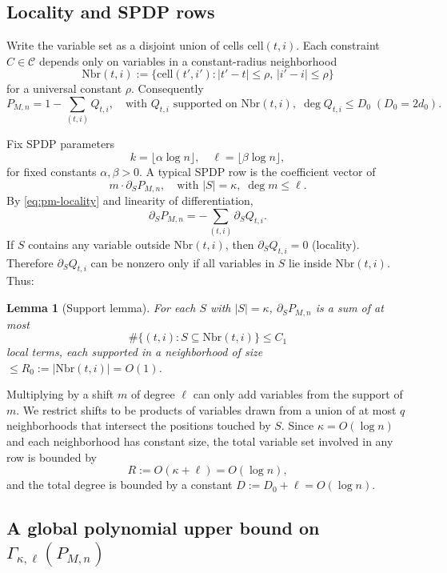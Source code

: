 \documentclass[12pt]{article}
\newtheorem{lemma}[theorem]{Lemma}
\theoremstyle{definition}
\theoremstyle{definition}
\theoremstyle{remark}
\theoremstyle{remark}
\begin{document}
\subsection{Locality and SPDP rows}

Write the variable set as a disjoint union of cells $\mathrm{cell}(t,i)$. Each constraint $C \in \mathcal{C}$ depends only on variables in a constant-radius neighborhood
\[
\mathrm{Nbr}(t,i) := \{\mathrm{cell}(t',i') : |t' - t| \leq \rho, \, |i' - i| \leq \rho\}
\]
for a universal constant $\rho$. Consequently
\begin{equation}\label{eq:pm-locality}
P_{M,n} = 1 - \sum_{(t,i)} Q_{t,i}, \quad\text{with } Q_{t,i} \text{ supported on } \mathrm{Nbr}(t,i), \; \deg Q_{t,i} \leq D_0 \; (D_0 = 2d_0).
\end{equation}

Fix SPDP parameters
\[
k = \lfloor \alpha \log n \rfloor, \quad \ell = \lfloor \beta \log n \rfloor,
\]
for fixed constants $\alpha, \beta > 0$. A typical SPDP row is the coefficient vector of
\[
m \cdot \partial_S P_{M,n}, \quad\text{with } |S| = \kappa, \; \deg m \leq \ell.
\]
By \eqref{eq:pm-locality} and linearity of differentiation,
\[
\partial_S P_{M,n} = - \sum_{(t,i)} \partial_S Q_{t,i}.
\]
If $S$ contains any variable outside $\mathrm{Nbr}(t,i)$, then $\partial_S Q_{t,i} = 0$ (locality). Therefore $\partial_S Q_{t,i}$ can be nonzero only if all variables in $S$ lie inside $\mathrm{Nbr}(t,i)$. Thus:

\begin{lemma}[Support lemma]\label{lem:tm-support}
For each $S$ with $|S| = \kappa$, $\partial_S P_{M,n}$ is a sum of at most
\[
\#\{(t,i) : S \subseteq \mathrm{Nbr}(t,i)\} \leq C_1
\]
local terms, each supported in a neighborhood of size $\leq R_0 := |\mathrm{Nbr}(t,i)| = O(1)$.
\end{lemma}

Multiplying by a shift $m$ of degree $\ell$ can only add variables from the support of $m$. We restrict shifts to be products of variables drawn from a union of at most $q$ neighborhoods that intersect the positions touched by $S$. Since $\kappa = O(\log n)$ and each neighborhood has constant size, the total variable set involved in any row is bounded by
\[
R := O(\kappa + \ell) = O(\log n),
\]
and the total degree is bounded by a constant $D := D_0 + \ell = O(\log n)$.

\subsection{A global polynomial upper bound on $\Gamma_{\kappa,\ell}(P_{M,n})$}
\end{document}
